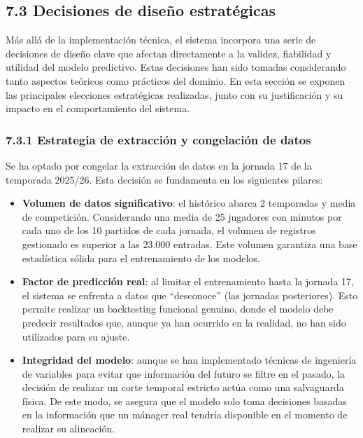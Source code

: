 \subsection{7.3 Decisiones de diseño estratégicas}
Más allá de la implementación técnica, el sistema incorpora una serie de
decisiones de diseño clave que afectan directamente a la validez, fiabilidad y
utilidad del modelo predictivo. Estas decisiones han sido tomadas considerando
tanto aspectos teóricos como prácticos del dominio.
En esta sección se exponen las principales elecciones estratégicas realizadas,
junto con su justificación y su impacto en el comportamiento del sistema.
 
\subsubsection{7.3.1 Estrategia de extracción y congelación de datos}
 
Se ha optado por congelar la extracción de datos en la jornada 17 de la
temporada 2025/26. Esta decisión se fundamenta en los siguientes pilares:
 
\begin{itemize}
\item \textbf{Volumen de datos significativo}: el histórico abarca 2 temporadas
y media de competición. Considerando una media de 25 jugadores con minutos por
cada uno de los 10 partidos de cada jornada, el volumen de registros gestionado
es superior a las 23.000 entradas. Este volumen garantiza una base estadística
sólida para el entrenamiento de los modelos.
 
\item \textbf{Factor de predicción real}: al limitar el entrenamiento hasta la
jornada 17, el sistema se enfrenta a datos que ``desconoce'' (las jornadas
posteriores). Esto permite realizar un backtesting funcional genuino, donde el
modelo debe predecir resultados que, aunque ya han ocurrido en la realidad, no
han sido utilizados para su ajuste.
 
\item \textbf{Integridad del modelo}: aunque se han
implementado técnicas de ingeniería de variables para evitar que información del
futuro se filtre en el pasado, la decisión de realizar un corte temporal
estricto actúa como una salvaguarda física. De este modo, se asegura que el
modelo solo toma decisiones basadas en la información que un mánager real
tendría disponible en el momento de realizar su alineación.
\end{itemize}
 
